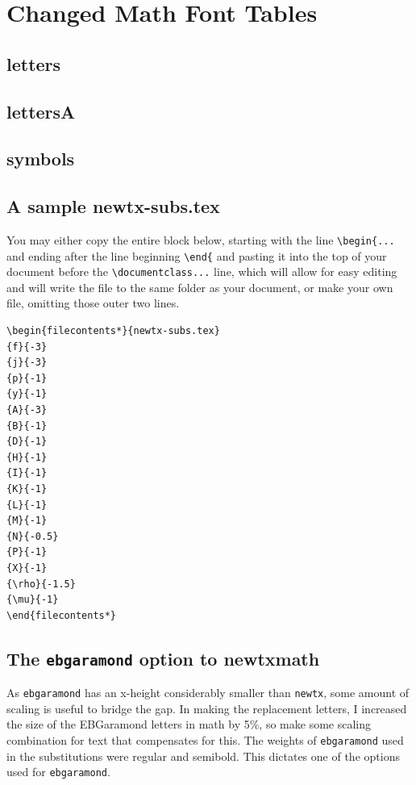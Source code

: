 \documentclass[\fsc]{article}
\theoremstyle{oldplain}
\theoremstyle{plain}
\begin{document}
\section{Changed Math Font Tables}
\subsection{letters}
\newpage  
\subsection{lettersA}
\newpage  
\subsection{symbols}
 
\subsection{A sample newtx-subs.tex}
You may either copy the entire block below, starting with the line \verb|\begin{...| and ending after the line beginning \verb|\end{|
and pasting it into the top of your document before the \verb|\documentclass...| line, which will allow for easy editing and will write the file to the same folder as your document, or make your own file, omitting those outer two lines.

\begin{verbatim}
\begin{filecontents*}{newtx-subs.tex}
{f}{-3}
{j}{-3}
{p}{-1}
{y}{-1}
{A}{-3}
{B}{-1}
{D}{-1}
{H}{-1}
{I}{-1}
{K}{-1}
{L}{-1}
{M}{-1}
{N}{-0.5}
{P}{-1}
{X}{-1}
{\rho}{-1.5}
{\mu}{-1}
\end{filecontents*}
\end{verbatim}
\subsection*{The {\tt ebgaramond} option to newtxmath}
As {\tt ebgaramond} has an x-height considerably smaller than {\tt newtx}, some amount of scaling is useful to bridge the gap. In making the replacement letters, I increased the size of the EBGaramond letters in math by 5\%, so make some scaling combination for text that compensates for this. The weights of {\tt ebgaramond} used in the substitutions were regular and semibold. This dictates one of the options used for {\tt ebgaramond}.
\end{document}

